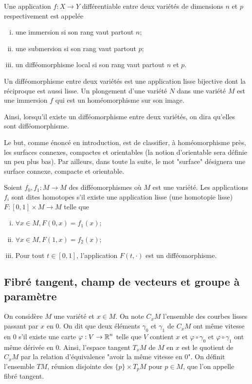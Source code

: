 \begin{defi}
    Une application $f:X\to Y$ différentiable entre deux variétés de dimensions $n$ 
    et $p$ respectivement est appelée 
    \begin{enumerate}[(i)]
        \item une immersion si son rang vaut partout $n$;
        \item une submersion si son rang vaut partout $p$;
        \item un difféomorphisme local si son rang vaut partout $n$ et $p$.
    \end{enumerate}
    Un difféomorphisme entre deux variétés est une application lisse bijective dont 
    la réciproque est aussi lisse.  Un plongement d'une variété $N$ dans une variété 
    $M$ est une immersion $f$ qui est un homéomorphisme sur son image. 
\end{defi}

Ainsi, lorsqu'il existe un difféomorphisme entre deux variétés, on dira qu'elles sont 
difféomorphisme.

Le but, comme énoncé en introduction, est de classifier, à homéomorphisme près, les 
surfaces connexes, compactes et orientables (la notion d'orientable sera définie un 
peu plus bas). Par ailleurs, dans toute la suite, le mot "surface" désignera une surface 
connexe, compacte et orientable.

\begin{defi}
    Soient $f_0,f_1:M\to M$ des difféomorphismes où $M$ est une variété.
    Les applications $f_i$ sont dites homotopes s'il existe une application lisse 
    (une homotopie lisse) $F:[0,1]\times M\to M$ telle que 
    \begin{enumerate}[(i)]
        \item $\forall x\in M, F(0,x)=f_1(x)$;
        \item $\forall x\in M, F(1,x)=f_2(x)$;
        \item Pour tout $t\in[0,1]$, l'application $F(t,\cdot)$ est un difféomorphisme.
    \end{enumerate}
\end{defi}

\subsection{Fibré tangent, champ de vecteurs et groupe à paramètre}
\begin{defi}
    On considère $M$ une variété et $x\in M$. On note $C_xM$ l'ensemble des courbes 
    lisses passant par $x$ en $0$.
    On dit que deux éléments $\gamma_0$ et $\gamma_1$ de $C_xM$ ont même vitesse en 
    $0$ s'il existe une carte $\varphi:V\to\operatorname{\mathbb R}^n$ telle que $V$ contient $x$ et 
    $\varphi\circ\gamma_0$ et $\varphi\circ\gamma_1$ ont même dérivée en $0$.
    Ainsi, l'espace tangent $T_xM$ de $M$ en $x$ est le quotient de $C_xM$ par la 
    relation d'équivalence "avoir la même vitesse en $0$". 
    On définit l'ensemble $TM$, réunion disjointe des $\lbrace p\rbrace\times T_pM$ 
    pour $p\in M$, que l'on appelle fibré tangent.
\end{defi}

